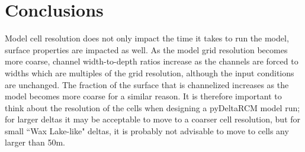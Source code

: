 \section{Conclusions}
Model cell resolution does not only impact the time it takes to run the model, surface properties are impacted as well.
As the model grid resolution becomes more coarse, channel width-to-depth ratios increase as the channels are forced to widths which are multiples of the grid resolution, although the input conditions are unchanged.
The fraction of the surface that is channelized increases as the model becomes more coarse for a similar reason.
It is therefore important to think about the resolution of the cells when designing a pyDeltaRCM model run; for larger deltas it may be acceptable to move to a coarser cell resolution, but for small ``Wax Lake-like" deltas, it is probably not advisable to move to cells any larger than 50m.

\clearpage

